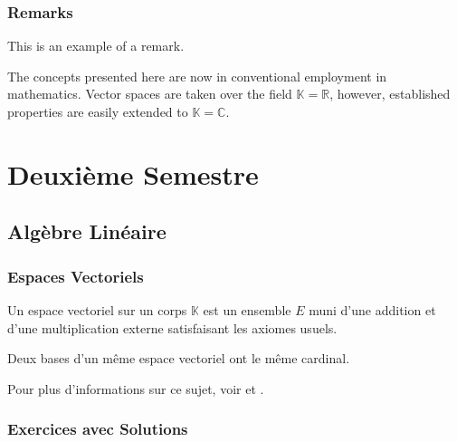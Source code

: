 \documentclass[11pt,%
	fleqn,%
	a4paper,%
	twoside%
]{backagBook}
\begin{document}
\section{Remarks}

This is an example of a remark.

\begin{remark}
    The concepts presented here are now in conventional employment in mathematics. Vector spaces are taken over the field $\mathbb{K}=\mathbb{R}$, however, established properties are easily extended to $\mathbb{K}=\mathbb{C}$.
\end{remark}


\part{Deuxième Semestre}
\chapter{Algèbre Linéaire}

\section{Espaces Vectoriels}

\begin{definition}
Un espace vectoriel sur un corps $\mathbb{K}$ est un ensemble $E$ muni d'une addition et d'une multiplication externe satisfaisant les axiomes usuels.
\end{definition}

\begin{theorem}
Deux bases d'un même espace vectoriel ont le même cardinal.
\end{theorem}

\begin{remark}
Pour plus d'informations sur ce sujet, voir \cite{Smith:2021qr} et \cite{Naoufal:2025jd}.
\end{remark}

\section{Exercices avec Solutions}
\end{document}

